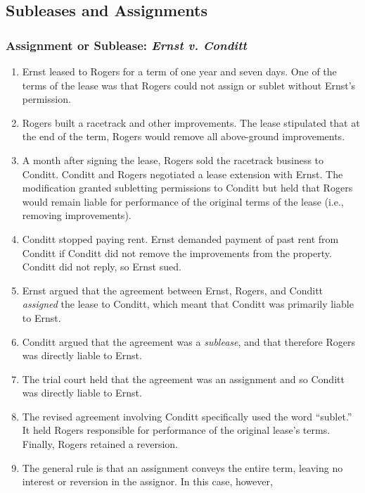 \subsection{Subleases and Assignments}

\subsubsection{Assignment or Sublease: \emph{Ernst v. Conditt}}

\begin{enumerate}
    \item Ernst leased to Rogers for a term of one year and seven days. One of 
    the terms of the lease was that Rogers could not assign or sublet without 
    Ernst's permission.
    \item Rogers built a racetrack and other improvements. The lease 
    stipulated that at the end of the term, Rogers would remove all 
    above-ground improvements.
    \item A month after signing the lease, Rogers sold the racetrack business 
    to Conditt. Conditt and Rogers negotiated a lease extension with Ernst. 
    The modification granted subletting permissions to Conditt but held that 
    Rogers would remain liable for performance of the original terms of the 
    lease (i.e., removing improvements).
    \item Conditt stopped paying rent. Ernst demanded payment of past rent 
    from Conditt if Conditt did not remove the improvements from the property. 
    Conditt did not reply, so Ernst sued.
    \item Ernst argued that the agreement between Ernst, Rogers, and Conditt 
    \emph{assigned} the lease to Conditt, which meant that Conditt was 
    primarily liable to Ernst.
    \item Conditt argued that the agreement was a \emph{sublease}, and that 
    therefore Rogers was directly liable to Ernst.
    \item The trial court held that the agreement was an assignment and so 
    Conditt was directly liable to Ernst.
    \item The revised agreement involving Conditt specifically used the word 
    ``sublet.'' It held Rogers responsible for performance of the original 
    lease's terms. Finally, Rogers retained a reversion.
    \item The general rule is that an assignment conveys the entire term, 
    leaving no interest or reversion in the assignor. In this case, however, 

\end{enumerate}
